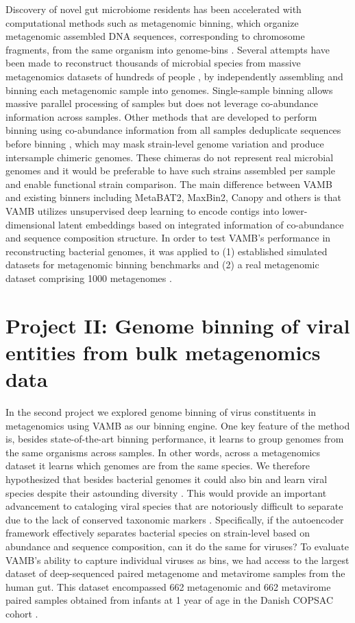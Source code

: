 Discovery of novel gut microbiome residents has been accelerated with computational methods such as metagenomic binning, which organize metagenomic assembled DNA sequences, corresponding to chromosome fragments, from the same organism into genome-bins \cite{Almeida2019-fk}. Several attempts have been made to reconstruct thousands of microbial species from massive metagenomics datasets of hundreds of people \cite{Parks2017-jk,Pasolli2019-ik}, by independently assembling and binning each metagenomic sample into genomes. Single-sample binning allows massive parallel processing of samples but does not leverage co-abundance information across samples. Other methods that are developed to perform binning using co-abundance information from all samples deduplicate sequences before binning \cite{Kang2019-su,Wu2016-fe}, which may mask strain-level genome variation and produce intersample chimeric genomes. These chimeras do not represent real microbial genomes and it would be preferable to have such strains assembled per sample and enable functional strain comparison. The main difference between VAMB and existing binners including MetaBAT2, MaxBin2, Canopy and others is that VAMB utilizes unsupervised deep learning to encode contigs into lower-dimensional latent embeddings based on integrated information of co-abundance and sequence composition structure. In order to test VAMB’s performance in reconstructing bacterial genomes, it was applied to (1) established simulated datasets for metagenomic binning benchmarks \cite{Sczyrba2017-ay} and (2) a real metagenomic dataset comprising 1000 metagenomes \cite{Almeida2019-fk}.

\section{Project II: Genome binning of viral entities from bulk metagenomics data}

In the second project we explored genome binning of virus constituents in metagenomics using VAMB as our binning engine. One key feature of the method is, besides state-of-the-art binning performance, it learns to group genomes from the same organisms across samples. In other words, across a metagenomics dataset it learns which genomes are from the same species. We therefore hypothesized that besides bacterial genomes it could also bin and learn viral species despite their astounding diversity \cite{Aggarwala2017-nz}. This would provide an important advancement to cataloging viral species that are notoriously difficult to separate due to the lack of conserved taxonomic markers 
\cite{Roux2019-dc}. Specifically, if the autoencoder framework effectively separates bacterial species on strain-level based on abundance and sequence composition, can it do the same for viruses? To evaluate VAMB’s ability to capture individual viruses as bins, we had access to the largest dataset of deep-sequenced paired metagenome and metavirome samples from the human gut. This dataset encompassed 662 metagenomic and 662 metavirome paired samples obtained from infants at 1 year of age in the Danish COPSAC cohort \cite{Shah_undated-vc}.\\


